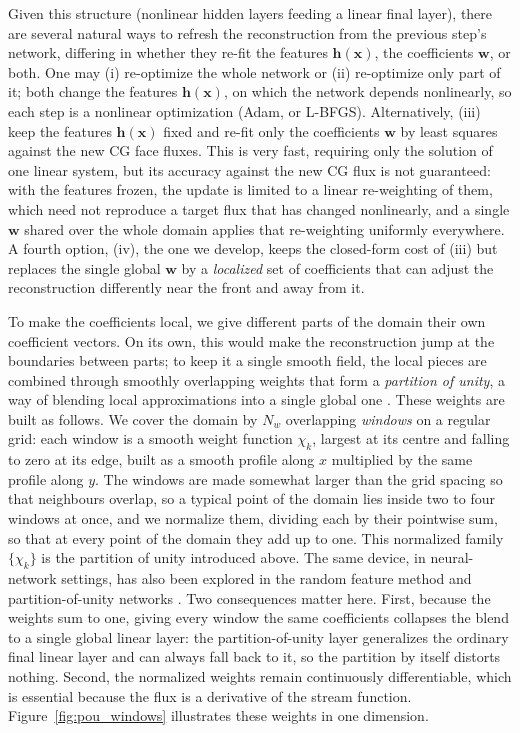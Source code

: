 \documentclass[a4paper,fleqn]{cas-sc}
\begin{document}
Given this structure (nonlinear hidden layers feeding a linear final
layer), there are several natural ways to refresh the reconstruction from the
previous step's network, differing in whether they re-fit the features
\(\mathbf{h}(\mathbf{x})\), the coefficients \(\mathbf{w}\), or both. One may
(i) re-optimize the whole network or (ii) re-optimize only part of it; both
change the features \(\mathbf{h}(\mathbf{x})\), on which the network depends
nonlinearly, so each step is a nonlinear optimization (Adam, or L-BFGS).
Alternatively, (iii) keep the features \(\mathbf{h}(\mathbf{x})\) fixed and
re-fit only the coefficients \(\mathbf{w}\) by least squares against the new CG
face fluxes. This is very fast, requiring only the solution of one linear
system, but its accuracy against the new CG flux is not guaranteed: with the
features frozen, the update is limited to a linear re-weighting of them, which
need not reproduce a target flux that has changed nonlinearly, and a single
\(\mathbf{w}\) shared over the whole domain applies that re-weighting uniformly
everywhere. A fourth option, (iv), the one we develop, keeps the closed-form cost of (iii)
but replaces the single global \(\mathbf{w}\) by a \emph{localized} set of
coefficients that can adjust the reconstruction differently near the front and
away from it.

To make the coefficients local, we give different parts of the domain their own
coefficient vectors. On its own, this would make the reconstruction jump at the
boundaries between parts; to keep it a single smooth field, the local pieces are
combined through smoothly overlapping weights that form a \emph{partition of
unity}, a way of blending local approximations into a single global one
\citep{MelenkBabuska1996}. These weights are built as follows. We cover the
domain by \(N_w\) overlapping \emph{windows} on a regular grid: each window is a
smooth weight function \(\chi_k\), largest at its centre and falling to zero at
its edge, built as a smooth profile along \(x\) multiplied by the same profile
along \(y\). The windows are made somewhat larger than the grid spacing so that
neighbours overlap, so a typical point of the domain lies inside two to four
windows at once, and we normalize them, dividing each by their pointwise sum,
so that at every point of the domain they add up to one. This normalized
family \(\{\chi_k\}\) is the partition of unity introduced above. The same
device, in neural-network settings, has also been explored in the random
feature method and partition-of-unity networks
\citep{ChenRFM2022,LeeTrask2021}. Two consequences matter here. First, because
the weights sum to one, giving every window the same coefficients collapses the
blend to a single global linear layer: the partition-of-unity layer generalizes
the ordinary final linear layer and can always fall back to it, so the
partition by itself distorts nothing. Second, the normalized weights remain
continuously differentiable, which is essential because the flux is a
derivative of the stream function.
Figure~\ref{fig:pou_windows} illustrates these weights in one dimension.
\end{document}
